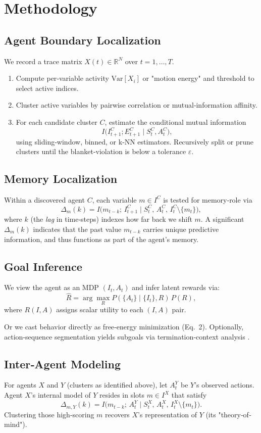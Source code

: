 \documentclass[10pt,conference]{IEEEtran}
\begin{document}
\section{Methodology}

\subsection{Agent Boundary Localization}
We record a trace matrix $X(t)\in\mathbb{R}^N$ over $t=1,\dots,T$.
\begin{enumerate}
  \item Compute per‐variable activity $\mathrm{Var}[X_i]$ or "motion energy" and threshold to select active indices.
  \item Cluster active variables by pairwise correlation or mutual‐information affinity.
  \item For each candidate cluster $C$, estimate the conditional mutual information
  \[
  I\bigl(I^C_{t+1};E^C_{t+1}\mid S^C_t,A^C_t\bigr),
  \]
  using sliding‐window, binned, or k‐NN estimators.  Recursively split or prune clusters until the blanket‐violation is below a tolerance $\varepsilon$.
\end{enumerate}

\subsection{Memory Localization}
Within a discovered agent $C$, each variable $m\in I^C$ is tested for memory‐role via
\[
\Delta_m(k)
=
I\bigl(m_{t-k};\,I^C_{t+1}\mid S^C_t,\,A^C_t,\,I^C_t\setminus\{m_t\}\bigr),
\]
where $k$ (the \emph{lag} in time‐steps) indexes how far back we shift $m$.  A significant $\Delta_m(k)$ indicates that the past value $m_{t-k}$ carries unique predictive information, and thus functions as part of the agent's memory.  


\subsection{Goal Inference}
We view the agent as an MDP $(I_t,A_t)$ and infer latent rewards via:
\[
\hat R = \arg\max_R P(\{A_t\}\mid\{I_t\},R)\,P(R),
\]
where $R(I,A)$ assigns scalar utility to each $(I,A)$ pair.

Or we cast behavior directly as free‐energy minimization (Eq.~2).
Optionally, action‐sequence segmentation yields subgoals via termination‐context analysis \cite{NgRussell2000,Ziebart2008}.


\subsection{Inter‐Agent Modeling}
For agents $X$ and $Y$ (clusters as identified above), let $A^Y_t$ be $Y$'s observed actions.  Agent $X$'s internal model of $Y$ resides in slots $m\in I^X$ that satisfy
\[
\Delta_{m,Y}(k)
=
I\bigl(m_{t-k};\,A^Y_t\mid S^X_t,\,A^X_t,\,I^X_t\setminus\{m_t\}\bigr).
\]
Clustering those high‐scoring $m$ recovers $X$'s representation of $Y$ (its "theory‐of‐mind").
\end{document}
